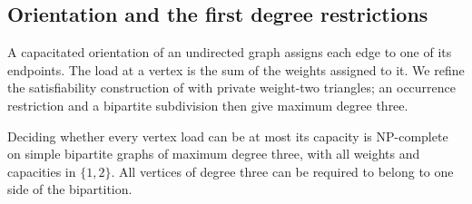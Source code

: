 \subsection{Orientation and the first degree restrictions}\label{s3:orientation}

A capacitated orientation of an undirected graph assigns each edge to one
of its endpoints. The load at a vertex is the sum of the weights assigned
to it. We refine the satisfiability construction of
\citet[Section~5]{s3:asahiro2011} with private weight-two triangles; an
occurrence restriction and a bipartite subdivision then give maximum
degree three.

\begin{lemma}\label{s3:co}
Deciding whether every vertex load can be at most its capacity is
NP-complete on simple bipartite graphs of maximum degree three, with all
weights and capacities in $\{1,2\}$. All vertices of degree three can be
required to belong to one side of the bipartition.
\end{lemma}
